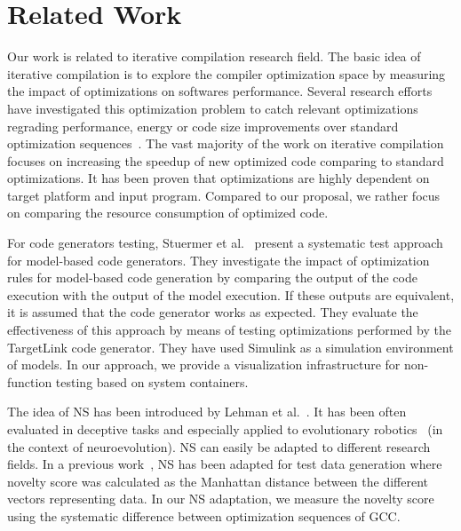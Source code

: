 \section{Related Work}
Our work is related to iterative compilation research field.
The basic idea of iterative compilation is to explore
the compiler optimization space by measuring the impact of optimizations on softwares performance.
Several research efforts have investigated this optimization problem to catch relevant optimizations regrading performance, energy or code size improvements over standard optimization sequences~\cite{almagor2004finding,hoste2008cole,jantz2013performance,pan2006fast,zhong2009tuning,pallister2015identifying,chen2012deconstructing,sandran2012genetic,martins2014exploration,fursin2008milepost,lin2008automatic,schulte2014post}. 
The vast majority of the work on iterative compilation focuses on increasing the speedup of new optimized code comparing to standard optimizations. 
It has been proven that optimizations are highly dependent on target platform and input program. Compared to our proposal, we rather focus on comparing the resource consumption of optimized code.

For code generators testing, Stuermer et al.~\cite{stuermer2007systematic} present a systematic test approach for model-based code generators. 
They investigate  the impact of optimization rules for model-based code generation by comparing the output of the code execution with the output of the model execution. 
If these outputs are equivalent, it is assumed that the code generator works as expected. 
They evaluate the effectiveness of this approach by means of testing optimizations performed by the TargetLink code generator. 
They have used Simulink as a simulation environment of models. 
In our approach, we provide a visualization infrastructure for non-function testing based on system containers.

The idea of NS has been introduced by Lehman et al.~\cite{lehman2008exploiting}. 
It has been often evaluated in deceptive tasks and especially applied to evolutionary robotics~\cite{risi2010evolving,krvcah2012solving} (in the context of neuroevolution). 
NS can easily be adapted to different research fields. 
In a previous work~\cite{boussaa2015novelty}, NS has been adapted for test data generation where novelty score was calculated as the Manhattan distance between the different vectors representing data.
In our NS adaptation, we measure the novelty score using the systematic difference between optimization sequences of GCC.